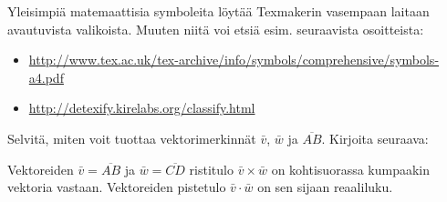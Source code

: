 \begin{fframe}
    Yleisimpiä matemaattisia symboleita löytää Texmakerin vasempaan laitaan avautuvista valikoista. Muuten niitä voi etsiä esim. seuraavista osoitteista:
    \begin{scriptsize}
        \begin{itemize}
            \item \url{http://www.tex.ac.uk/tex-archive/info/symbols/comprehensive/symbols-a4.pdf}
            \item \url{http://detexify.kirelabs.org/classify.html}
        \end{itemize}
    \end{scriptsize}
    \begin{harj}
        Selvitä, miten voit tuottaa vektorimerkinnät \(\bar{v}\), \(\bar{w}\) ja \(\overline{AB}\). Kirjoita seuraava:
        \begin{sample}
            Vektoreiden \(\bar{v}=\overline{AB}\) ja \(\bar{w}=\overline{CD}\) ristitulo \(\bar{v}\times\bar{w}\) on kohtisuorassa kumpaakin vektoria vastaan. Vektoreiden pistetulo \(\bar{v}\cdot\bar{w}\) on sen sijaan reaaliluku.
        \end{sample}
    \end{harj}

\end{fframe}

